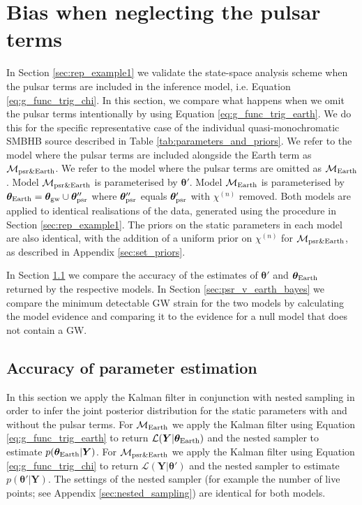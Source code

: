 \documentclass[fleqn,usenatbib,useAMS]{mnras}
\begin{document}
	

\section{Bias when neglecting the pulsar terms}\label{sec:earth_vs_psr}
In Section \ref{sec:rep_example1} we validate the state-space analysis scheme when the pulsar terms are included in the inference model, i.e. Equation \eqref{eq:g_func_trig_chi}. In this section, we compare what happens when we omit the pulsar terms intentionally by using Equation \eqref{eq:g_func_trig_earth}. We do this for the specific representative case of the individual quasi-monochromatic SMBHB source described in Table \ref{tab:parameters_and_priors}. We refer to the model where the pulsar terms are included alongside the Earth term as $\mathcal{M}_{\rm psr \& Earth}$. We refer to the model where the pulsar terms are omitted as 
$\mathcal{M}_{\rm Earth}$. Model $\mathcal{M}_{\rm psr \& Earth}$ is parameterised by $\boldsymbol{\theta}'$. Model $\mathcal{M}_{\rm Earth}$ is parameterised by $\boldsymbol{\theta}_{\rm Earth} = \boldsymbol{\theta}_{\rm gw} \cup \boldsymbol{\theta}''_{\rm psr}$ where $\boldsymbol{\theta}''_{\rm psr}$ equals $\boldsymbol{\theta}'_{\rm psr}$ with $\chi^{(n)}$ removed. Both models are applied to identical realisations of the data, generated using the procedure in Section  \ref{sec:rep_example1}. The priors on the static parameters in each model are also identical, with the addition of a uniform prior on $\chi^{(n)}$ for $\mathcal{M}_{\rm psr \& Earth}$, as described in Appendix \ref{sec:set_priors}. \newline 


In Section \ref{sec:psr_v_earth_pe} we compare the accuracy of the estimates of $\boldsymbol{\theta'}$ and $\boldsymbol{\theta}_{\rm Earth}$ returned by the respective models. In Section \ref{sec:psr_v_earth_bayes} we compare the minimum detectable GW strain for the two models by calculating the model evidence and comparing it to the evidence for a null model that does not contain a GW.

\subsection{Accuracy of parameter estimation}\label{sec:psr_v_earth_pe}

In this section we apply the Kalman filter in conjunction with nested sampling in order to infer the joint posterior distribution for the static parameters with and without the pulsar terms. For $\mathcal{M}_{\rm Earth}$ we apply the Kalman filter using Equation \eqref{eq:g_func_trig_earth} to return $\mathcal{L}(\boldsymbol{Y}| \boldsymbol{\theta}_{\rm Earth})$ and the nested sampler to estimate $p(\boldsymbol{\theta}_{\rm Earth} | \boldsymbol{Y})$. For $\mathcal{M}_{\rm psr \& Earth}$ we apply the Kalman filter using Equation \eqref{eq:g_func_trig_chi} to return $\mathcal{L}(\boldsymbol{Y}| \boldsymbol{\theta}')$ and the nested sampler to estimate $p(\boldsymbol{\theta'} | \boldsymbol{Y})$. The settings of the nested sampler (for example the number of live points; see Appendix \ref{sec:nested_sampling}) are identical for both models. \newline 
\end{document}
